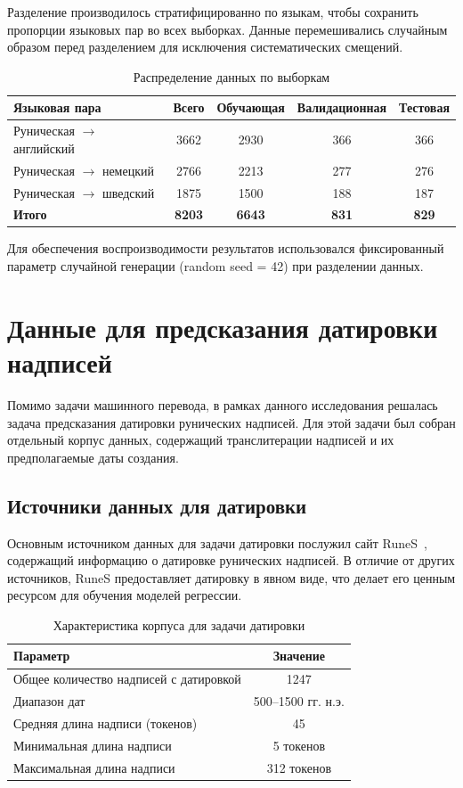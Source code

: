 \documentclass[14pt,a4paper]{extreport}
\begin{document}
Разделение производилось стратифицированно по языкам, чтобы сохранить пропорции языковых пар во всех выборках. Данные перемешивались случайным образом перед разделением для исключения систематических смещений.

\begin{table}[H]
\centering
\caption{Распределение данных по выборкам}
\label{tab:split}
\begin{tabular}{|l|c|c|c|c|}
\hline
\textbf{Языковая пара} & \textbf{Всего} & \textbf{Обучающая} & \textbf{Валидационная} & \textbf{Тестовая} \\
\hline
Руническая $\to$ английский & 3662 & 2930 & 366 & 366 \\
\hline
Руническая $\to$ немецкий & 2766 & 2213 & 277 & 276 \\
\hline
Руническая $\to$ шведский & 1875 & 1500 & 188 & 187 \\
\hline
\textbf{Итого} & \textbf{8203} & \textbf{6643} & \textbf{831} & \textbf{829} \\
\hline
\end{tabular}
\end{table}

Для обеспечения воспроизводимости результатов использовался фиксированный параметр случайной генерации (random seed = 42) при разделении данных.

\section{Данные для предсказания датировки надписей}

Помимо задачи машинного перевода, в рамках данного исследования решалась задача предсказания датировки рунических надписей. Для этой задачи был собран отдельный корпус данных, содержащий транслитерации надписей и их предполагаемые даты создания.

\subsection{Источники данных для датировки}

Основным источником данных для задачи датировки послужил сайт RuneS~\cite{runes}, содержащий информацию о датировке рунических надписей. В отличие от других источников, RuneS предоставляет датировку в явном виде, что делает его ценным ресурсом для обучения моделей регрессии.

\begin{table}[H]
\centering
\caption{Характеристика корпуса для задачи датировки}
\label{tab:dating_data}
\begin{tabular}{|l|c|}
\hline
\textbf{Параметр} & \textbf{Значение} \\
\hline
Общее количество надписей с датировкой & 1247 \\
\hline
Диапазон дат & 500--1500 гг. н.э. \\
\hline
Средняя длина надписи (токенов) & 45 \\
\hline
Минимальная длина надписи & 5 токенов \\
\hline
Максимальная длина надписи & 312 токенов \\
\hline
\end{tabular}
\end{table}
\end{document}
